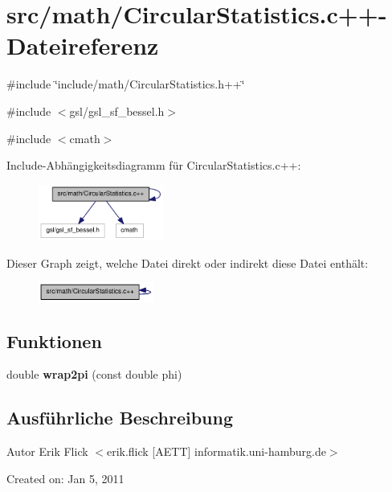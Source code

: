 \hypertarget{CircularStatistics_8c_09_09}{
\section{src/math/CircularStatistics.c++-\/Dateireferenz}
\label{CircularStatistics_8c_09_09}
}
{\ttfamily \#include \char`\"{}include/math/CircularStatistics.h++\char`\"{}}\par
{\ttfamily \#include $<$gsl/gsl\_\-sf\_\-bessel.h$>$}\par
{\ttfamily \#include $<$cmath$>$}\par
Include-\/Abhängigkeitsdiagramm für CircularStatistics.c++:\nopagebreak
\begin{figure}[H]
\begin{center}
\leavevmode
\includegraphics[width=116pt]{CircularStatistics_8c_09_09__incl}
\end{center}
\end{figure}
Dieser Graph zeigt, welche Datei direkt oder indirekt diese Datei enthält:\nopagebreak
\begin{figure}[H]
\begin{center}
\leavevmode
\includegraphics[width=107pt]{CircularStatistics_8c_09_09__dep__incl}
\end{center}
\end{figure}
\subsection*{Funktionen}
\begin{DoxyCompactItemize}
\item 
\hypertarget{CircularStatistics_8c_09_09_a53bb96d37a7af4fd27ce73a33a69c63a}{
double {\bfseries wrap2pi} (const double phi)}
\label{CircularStatistics_8c_09_09_a53bb96d37a7af4fd27ce73a33a69c63a}

\end{DoxyCompactItemize}


\subsection{Ausführliche Beschreibung}
\begin{DoxyAuthor}{Autor}
Erik Flick $<$erik.flick \mbox{[}AETT\mbox{]} informatik.uni-\/hamburg.de$>$
\end{DoxyAuthor}
Created on: Jan 5, 2011 